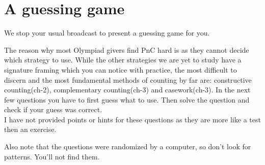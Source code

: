 \chapter{A guessing game}
We stop your usual broadcast to present a guessing game for you.\par
The reason why most Olympiad givers find PnC hard is as they cannot decide which strategy to use. While the other strategies we are yet to study have a signature framing which you can notice with practice, the most difficult to discern and the most fundamental methods of counting by far are: constructive counting(ch-2), complementary counting(ch-3) and casework(ch-3).  In the next few questions you have to first guess what to use. Then solve the question and check if your guess was correct. \\
I have not provided points or hints for these questions as they are more like a test then an exercise.\par
Also note that the questions were randomized by a computer, so don't look for patterns. You'll not find them.
